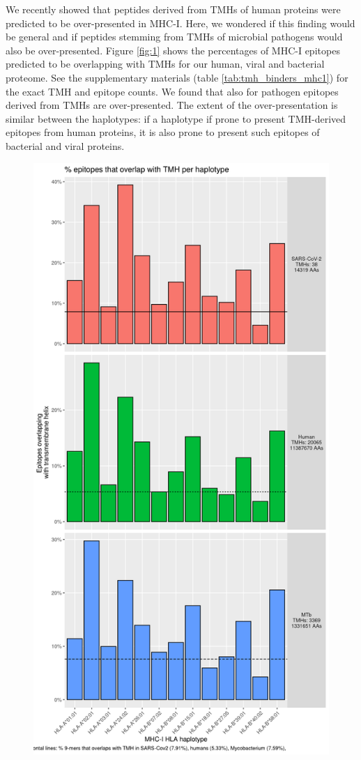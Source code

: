 We recently showed that peptides derived from TMHs of human proteins 
were predicted to be over-presented in MHC-I. 
Here, we wondered if this finding would be general 
and if peptides stemming from TMHs of microbial pathogens 
would also be over-presented.
Figure \ref{fig:1} shows the percentages of MHC-I epitopes predicted to be overlapping 
with TMHs for our human, viral and bacterial proteome.
See the supplementary materials (table \ref{tab:tmh_binders_mhc1}) 
for the exact TMH and epitope counts.
We found that also for pathogen epitopes derived from TMHs are
over-presented. 
The extent of the over-presentation is similar between the haplotypes:
if a haplotype if prone to present TMH-derived epitopes from
human proteins, it is also prone to present such epitopes of
bacterial and viral proteins.

\begin{figure}[!htbp]
  \includegraphics[height=0.9\textheight]{bbbq_1_smart_results/fig_f_tmh_mhc1_2_grid.png}

\end{figure}
